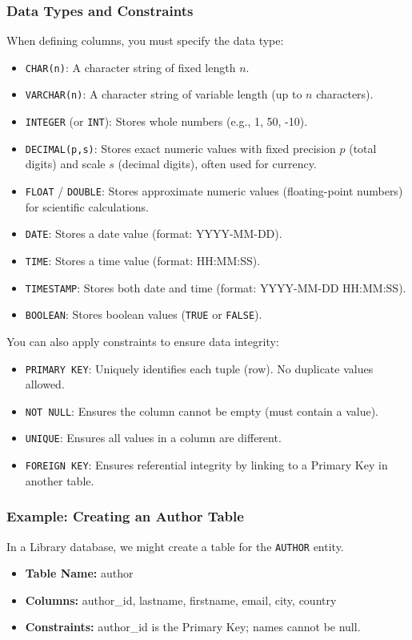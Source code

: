 \documentclass{article}
\begin{document}
\subsubsection{Data Types and Constraints}
When defining columns, you must specify the data type:
\begin{itemize}
    \item \texttt{CHAR(n)}: A character string of fixed length $n$.
    \item \texttt{VARCHAR(n)}: A character string of variable length (up to $n$ characters).
    \item \texttt{INTEGER} (or \texttt{INT}): Stores whole numbers (e.g., 1, 50, -10).
    \item \texttt{DECIMAL(p,s)}: Stores exact numeric values with fixed precision $p$ (total digits) and scale $s$ (decimal digits), often used for currency.
    \item \texttt{FLOAT} / \texttt{DOUBLE}: Stores approximate numeric values (floating-point numbers) for scientific calculations.
    \item \texttt{DATE}: Stores a date value (format: YYYY-MM-DD).
    \item \texttt{TIME}: Stores a time value (format: HH:MM:SS).
    \item \texttt{TIMESTAMP}: Stores both date and time (format: YYYY-MM-DD HH:MM:SS).
    \item \texttt{BOOLEAN}: Stores boolean values (\texttt{TRUE} or \texttt{FALSE}).
\end{itemize}
You can also apply constraints to ensure data integrity:
\begin{itemize}
    \item \texttt{PRIMARY KEY}: Uniquely identifies each tuple (row). No duplicate values allowed.
    \item \texttt{NOT NULL}: Ensures the column cannot be empty (must contain a value).
    \item \texttt{UNIQUE}: Ensures all values in a column are different.
    \item \texttt{FOREIGN KEY}: Ensures referential integrity by linking to a Primary Key in another table.
\end{itemize}

\subsubsection{Example: Creating an Author Table}
In a Library database, we might create a table for the \texttt{AUTHOR} entity.
\begin{itemize}
    \item \textbf{Table Name:} author
    \item \textbf{Columns:} author\_id, lastname, firstname, email, city, country
    \item \textbf{Constraints:} author\_id is the Primary Key; names cannot be null.
\end{itemize}
\end{document}
